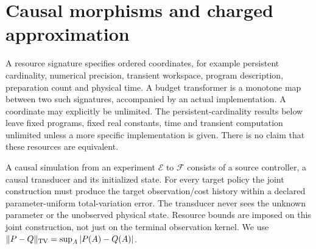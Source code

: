 \section{Causal morphisms and charged approximation}\label{sec:v7-transport}
A resource signature specifies ordered coordinates, for example
persistent cardinality, numerical precision, transient workspace,
program description, preparation count and physical time. A budget
transformer is a monotone map between two such signatures, accompanied
by an actual implementation. A coordinate may explicitly be unlimited.
The persistent-cardinality results below leave fixed programs, fixed
real constants, time and transient computation unlimited unless a more
specific implementation is given. There is no claim that these resources
are equivalent.

A causal simulation from an experiment $\mathcal E$ to $\mathcal F$
consists of a source controller, a causal transducer and its initialized
state. For every target policy the joint construction must produce the
target observation/cost history within a declared parameter-uniform
total-variation error. The transducer never sees the unknown parameter
or the unobserved physical state. Resource bounds are imposed on this
joint construction, not just on the terminal observation kernel. We
use $\|P-Q\|_{\rm TV}=\sup_A|P(A)-Q(A)|$.

